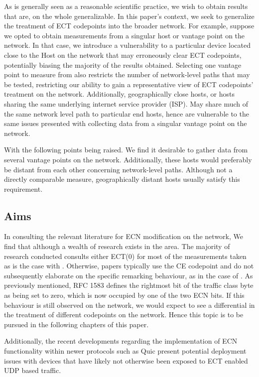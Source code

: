 \documentclass{l4proj}
\begin{document}
As is generally seen as a reasonable scientific practice, we wish to obtain results that are, on the whole generalizable. In this paper's context, we seek to generalize the treatment of ECT codepoints into the broader network. For example, suppose we opted to obtain measurements from a singular host or vantage point on the network. In that case, we introduce a vulnerability to a particular device located close to the Host on the network that may erroneously clear ECT codepoints, potentially biasing the majority of the results obtained. Selecting one vantage point to measure from also restricts the number of network-level paths that may be tested, restricting our ability to gain a representative view of ECT codepoints' treatment on the network. Additionally, geographically close hosts, or hosts sharing the same underlying internet service provider (ISP). May share much of the same network level path to particular end hosts, hence are vulnerable to the same issues presented with collecting data from a singular vantage point on the network. 

With the following points being raised. We find it desirable to gather data from several vantage points on the network. Additionally, these hosts would preferably be distant from each other concerning network-level paths. Although not a directly comparable measure, geographically distant hosts usually satisfy this requirement.

\subsection{Aims}
\label{sec:aims}

In consulting the relevant literature for ECN modification on the network, We find that although a wealth of research exists in the area. The majority of research conducted consults either ECT(0) for most of the measurements taken as is the case with \cite{mcquistin_is_2015}. Otherwise, papers typically use the CE codepoint and do not subsequently elaborate on the specific remarking behaviour, as in the case of \cite{bauer_measuring_2011}. As previously mentioned, RFC 1583 defines the rightmost bit of the traffic class byte as being set to zero, which is now occupied by one of the two ECN bits\cite{rfc1583}. If this behaviour is still observed on the network, we would expect to see a differential in the treatment of different codepoints on the network. Hence this topic is to be pursued in the following chapters of this paper. 

Additionally, the recent developments regarding the implementation of ECN functionality within newer protocols such as Quic present potential deployment issues with devices that have likely not otherwise been exposed to ECT enabled UDP based traffic. 
\end{document}
